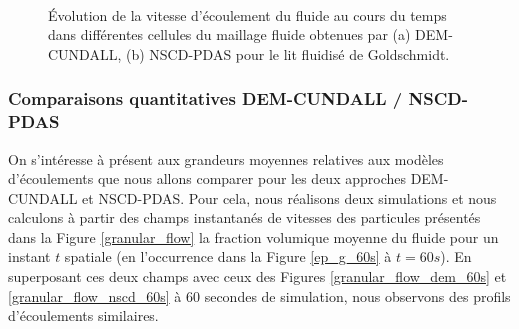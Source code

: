 \begin{figure}[h!]
\hspace{\fill}
   \\
\caption{\label{v_g_data-time}Évolution de la vitesse d'écoulement du fluide au cours du temps dans différentes cellules du maillage fluide obtenues par (a) DEM-CUNDALL, (b) NSCD-PDAS pour le lit fluidisé de Goldschmidt.}
\end{figure}

\subsubsection{Comparaisons quantitatives DEM-CUNDALL / NSCD-PDAS}

On s'intéresse à présent aux grandeurs moyennes relatives aux modèles d'écoulements que nous allons comparer pour les deux approches DEM-CUNDALL et NSCD-PDAS. Pour cela, nous réalisons deux simulations et nous calculons à partir des champs instantanés de vitesses des particules présentés dans la Figure \ref{granular_flow} la fraction volumique moyenne du fluide pour un instant $t$ spatiale (en l'occurrence dans la Figure \ref{ep_g_60s} à $t = 60s$). En superposant ces deux champs avec ceux des Figures \ref{granular_flow_dem_60s} et \ref{granular_flow_nscd_60s} à $60$ secondes de simulation, nous observons des profils d'écoulements similaires.  

